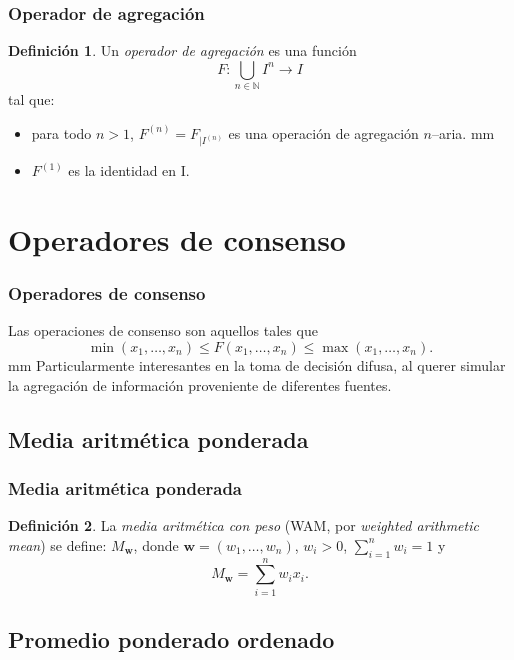 \documentclass{beamer}
\theoremstyle{definition}
\newtheorem{Def}{Definición}
\begin{document}
          \begin{frame}
            \frametitle{Operador de agregación}
            \begin{Def} %
              Un \emph{operador de agregación} es una función
	$$
	F: \bigcup_{n \in \mathbb{N}} I^n \to I
	$$ 
	tal que: \vskip 3mm
	\begin{itemize}
	\item para todo $n>1$, $F^{(n)}=F _{|{I^{(n)}}}$ es una
          operación de agregación $n$--aria.   mm
	\item $F^{(1)}$ es la identidad en I.
	\end{itemize}
      \end{Def}
    \end{frame}

    \section{Operadores de consenso}

    \begin{frame}
      \frametitle{Operadores de consenso}
      Las operaciones de consenso son aquellos tales que
  $$
  \min(x_1, \ldots, x_n) \le F(x_1, \ldots, x_n) \le \max(x_1, \ldots,
  x_n).
  $$
   mm Particularmente interesantes en la toma de decisión
  difusa, al querer simular la agregación de información proveniente
  de diferentes fuentes.
\end{frame}

\subsection{Media aritmética ponderada}
  
\begin{frame}
  \frametitle{Media aritmética ponderada}
  \begin{Def}
    La \emph{media aritmética con peso} (WAM, por \emph{weighted
      arithmetic mean}) se define: $M_{\mathbf{w}}$, donde
    $\mathbf{w} = (w_1, \ldots,w_n)$, $w_i > 0$,
    $\sum_{i=1}^n w_i = 1$ y
    $$
    M_{\mathbf{w}} = \sum_{i = 1}^n w_i x_i.
    $$
  \end{Def}
\end{frame}

\subsection{Promedio ponderado ordenado}
\end{document}
